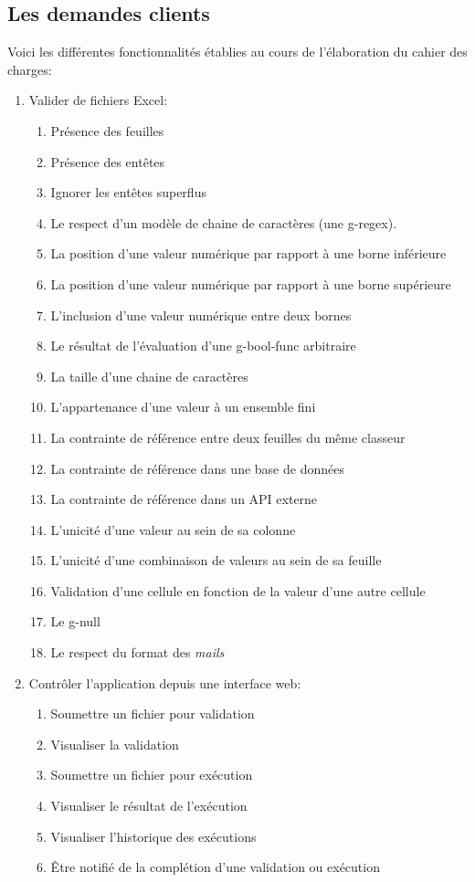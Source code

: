 \subsection{Les demandes clients}
\label{subsec:customer-requests}

Voici les différentes fonctionnalités établies au cours de l'élaboration du cahier des charges:
\begin{enumerate}
    \item Valider de fichiers Excel:
    \begin{enumerate}
        \item Présence des feuilles
        \item Présence des entêtes
        \item Ignorer les entêtes superflus
        \item Le respect d'un modèle de chaine de caractères (une \gls{g-regex}).
        \item La position d'une valeur numérique par rapport à une borne inférieure
        \item La position d'une valeur numérique par rapport à une borne supérieure
        \item L'inclusion d'une valeur numérique entre deux bornes
        \item Le résultat de l'évaluation d'une \gls{g-bool-func} arbitraire
        \item La taille d'une chaine de caractères
        \item L'appartenance d'une valeur à un ensemble fini
        \item La contrainte de référence\fnmark{} entre deux feuilles du même classeur
        \item La contrainte de référence dans une base de données
        \item La contrainte de référence dans un API externe
        \item L'unicité d'une valeur au sein de sa colonne
        \item L'unicité d'une combinaison de valeurs au sein de sa feuille
        \item Validation d'une cellule en fonction de la valeur d'une autre cellule
        \item Le \gls{g-null}
        \item Le respect du format des \textit{mails}
    \end{enumerate}
    \item Contrôler l'application depuis une interface web:
    \begin{enumerate}
        \item Soumettre un fichier pour validation
        \item Visualiser la validation
        \item Soumettre un fichier pour exécution
        \item Visualiser le résultat de l'exécution
        \item Visualiser l'historique des exécutions
        \item Être notifié de la complétion d'une validation ou exécution
    \end{enumerate}
\end{enumerate}
    
